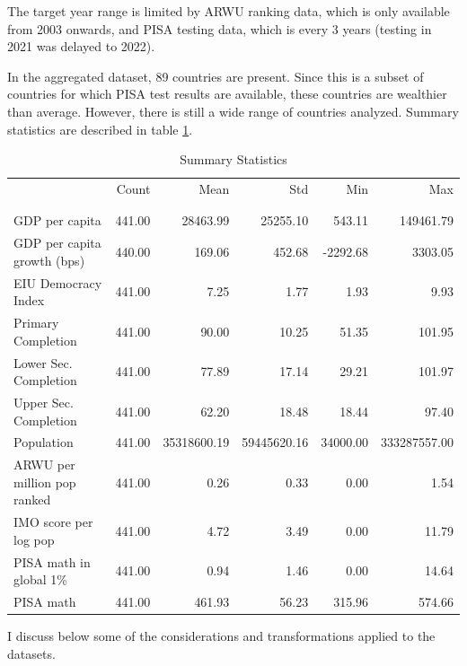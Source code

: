 \documentclass[11pt]{article}
\begin{document}
The target year range is limited by ARWU ranking data, which is only available from 2003 onwards, and PISA testing data, which is every 3 years (testing in 2021 was delayed to 2022).

In the aggregated dataset, 89 countries are present. Since this is a subset of countries for which PISA test results are available, these countries are wealthier than average. However, there is still a wide range of countries analyzed. Summary statistics are described in table \ref{table:summary}.

\begin{table}
        \caption{Summary Statistics}
        \resizebox{\linewidth}{!} {
            \begin{tabular}{lrrrrr}
                & Count & Mean & Std & Min & Max \\
                \\[-1.8ex]\hline
                \hline \\[-1.8ex]
               GDP per capita & 441.00 & 28463.99 & 25255.10 & 543.11 & 149461.79 \\
               GDP per capita growth (bps) & 440.00 & 169.06 & 452.68 & -2292.68 & 3303.05 \\
               EIU Democracy Index & 441.00 & 7.25 & 1.77 & 1.93 & 9.93 \\
               Primary Completion & 441.00 & 90.00 & 10.25 & 51.35 & 101.95 \\
               Lower Sec. Completion & 441.00 & 77.89 & 17.14 & 29.21 & 101.97 \\
               Upper Sec. Completion & 441.00 & 62.20 & 18.48 & 18.44 & 97.40 \\
               Population & 441.00 & 35318600.19 & 59445620.16 & 34000.00 & 333287557.00 \\
               ARWU per million pop ranked & 441.00 & 0.26 & 0.33 & 0.00 & 1.54 \\
               IMO score per log pop & 441.00 & 4.72 & 3.49 & 0.00 & 11.79 \\
               PISA math in global 1\% & 441.00 & 0.94 & 1.46 & 0.00 & 14.64 \\
               PISA math & 441.00 & 461.93 & 56.23 & 315.96 & 574.66 \\
               \end{tabular}
        }
        \label{table:summary}
\end{table}

I discuss below some of the considerations and transformations applied to the datasets.
\end{document}

